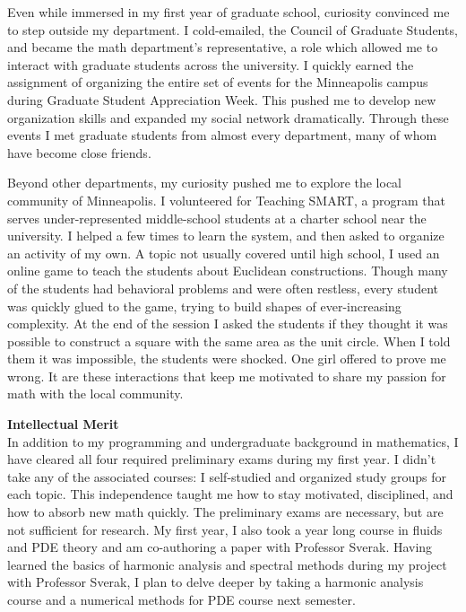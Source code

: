 \documentclass[12pt]{article}
\begin{document}
Even while immersed in my first year of graduate school,  curiosity convinced me to step outside my department. I cold-emailed, the Council of Graduate Students, and became the math department's representative, a role which allowed me to interact with graduate students across the university. I quickly earned the assignment of organizing the entire set  of events for the Minneapolis campus during Graduate Student Appreciation Week. This pushed me to develop new organization skills and expanded my social network dramatically. Through these events I met graduate students from almost every department, many of whom have become close friends. 

Beyond other departments, my curiosity pushed me to explore the local community of Minneapolis. I volunteered for Teaching SMART, a program that serves under-represented middle-school students at a charter school near the university. I helped a few times to learn the system, and then asked to organize an activity of my own. A topic not usually covered until high school, I used an online game to teach the students about Euclidean constructions. Though many of the students had behavioral problems and were often restless, every student was quickly glued to the game, trying to build shapes of ever-increasing complexity. At the end of the session I asked the students if they thought it was possible to construct a square with the same area as the unit circle. When I told them it was impossible, the students were shocked. One girl offered to prove me wrong. It are these interactions that keep me motivated to share my passion for math with the local community. 


\textbf{Intellectual Merit}\\
In addition to my programming and undergraduate background in mathematics, I  have cleared all four required preliminary exams during  my first year. I didn't take any of the associated courses: I self-studied and organized study groups for each topic. This independence taught me how to stay motivated, disciplined, and how to absorb new math quickly. The preliminary exams are necessary, but are not sufficient for research. My first year, I also took a year long course in fluids and PDE theory and am co-authoring a paper with Professor Sverak. Having learned the basics of harmonic analysis and spectral methods during  my project with Professor Sverak, I plan to delve deeper by taking a harmonic analysis course and a numerical methods for PDE course next semester.
\end{document}
